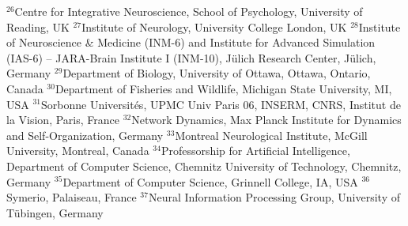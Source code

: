 $^{26}$Centre for Integrative Neuroscience, School of Psychology, University of Reading, UK
$^{27}$Institute of Neurology, University College London, UK
$^{28}$Institute of Neuroscience \& Medicine (INM-6) and Institute for Advanced Simulation (IAS-6) -- JARA-Brain Institute I (INM-10), Jülich Research Center, Jülich, Germany
$^{29}$Department of Biology, University of Ottawa, Ottawa, Ontario, Canada
$^{30}$Department of Fisheries and Wildlife, Michigan State University, MI, USA
$^{31}$Sorbonne Universités, UPMC Univ Paris 06, INSERM, CNRS, Institut de la Vision, Paris, France
$^{32}$Network Dynamics, Max Planck Institute for Dynamics and Self-Organization, Germany
$^{33}$Montreal Neurological Institute, McGill University, Montreal, Canada
$^{34}$Professorship for Artificial Intelligence, Department of Computer Science, Chemnitz University of Technology, Chemnitz, Germany
$^{35}$Department of Computer Science, Grinnell College, IA, USA
$^{36}$Symerio, Palaiseau, France
$^{37}$Neural Information Processing Group, University of Tübingen, Germany
\par